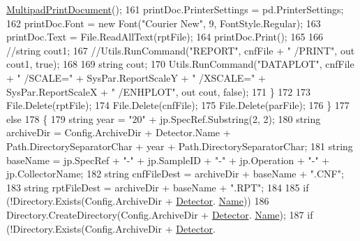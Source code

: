 \begin{DoxyCode}
      \hyperlink{class_multipad_print_document}{MultipadPrintDocument}();
161                         printDoc.PrinterSettings = pd.PrinterSettings;
162                         printDoc.Font = \textcolor{keyword}{new} Font(\textcolor{stringliteral}{"Courier New"}, 9, FontStyle.Regular);
163                         printDoc.Text = File.ReadAllText(rptFile);
164                         printDoc.Print();
165 
166                         \textcolor{comment}{//string cout1;}
167                         \textcolor{comment}{//Utils.RunCommand("REPORT", cnfFile + " /PRINT", out cout1, true);}
168 
169                         \textcolor{keywordtype}{string} cout;
170                         Utils.RunCommand(\textcolor{stringliteral}{"DATAPLOT"}, cnfFile + \textcolor{stringliteral}{" /SCALE="} + SysPar.ReportScaleY + \textcolor{stringliteral}{"
       /XSCALE="} + SysPar.ReportScaleX + \textcolor{stringliteral}{" /ENHPLOT"}, out cout, \textcolor{keyword}{false});
171                     \}
172 
173                     File.Delete(rptFile);
174                     File.Delete(cnfFile);
175                     File.Delete(parFile);
176                 \}
177                 \textcolor{keywordflow}{else}
178                 \{
179                     \textcolor{keywordtype}{string} year = \textcolor{stringliteral}{"20"} + jp.SpecRef.Substring(2, 2);
180                     \textcolor{keywordtype}{string} archiveDir = Config.ArchiveDir + Detector.Name + Path.DirectorySeparatorChar + 
      year + Path.DirectorySeparatorChar;
181                     \textcolor{keywordtype}{string} baseName = jp.SpecRef + \textcolor{stringliteral}{"-"} + jp.SampleID + \textcolor{stringliteral}{"-"} + jp.Operation + \textcolor{stringliteral}{"-"} + 
      jp.CollectorName;
182                     \textcolor{keywordtype}{string} cnfFileDest = archiveDir + baseName + \textcolor{stringliteral}{".CNF"};
183                     \textcolor{keywordtype}{string} rptFileDest = archiveDir + baseName + \textcolor{stringliteral}{".RPT"};
184 
185                     \textcolor{keywordflow}{if} (!Directory.Exists(Config.ArchiveDir + \hyperlink{class_scintilab_1_1_form_job_report_acfd377f5214f1677dbfcee75e848fd3e}{Detector}.
      \hyperlink{class_scintilab_1_1_detector_aeddbda805641ca8d8f8aaa30aea2f3e0}{Name}))
186                         Directory.CreateDirectory(Config.ArchiveDir + \hyperlink{class_scintilab_1_1_form_job_report_acfd377f5214f1677dbfcee75e848fd3e}{Detector}.
      \hyperlink{class_scintilab_1_1_detector_aeddbda805641ca8d8f8aaa30aea2f3e0}{Name});
187                     \textcolor{keywordflow}{if} (!Directory.Exists(Config.ArchiveDir + \hyperlink{class_scintilab_1_1_form_job_report_acfd377f5214f1677dbfcee75e848fd3e}{Detector}.

\end{DoxyCode}
